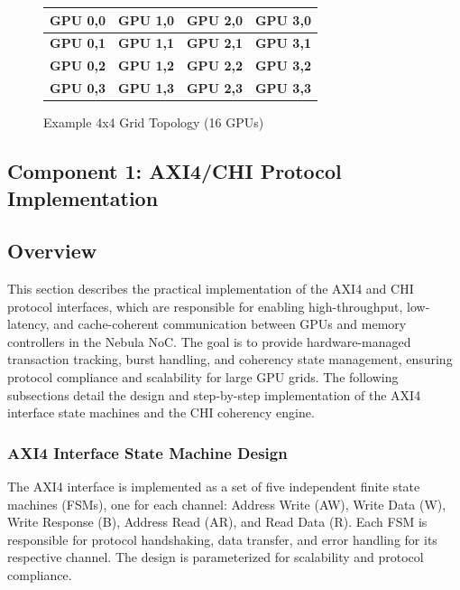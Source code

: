\documentclass[11pt,a4paper]{article}
\begin{document}
\begin{figure}[H]
    \centering
    \begin{tabular}{|c|c|c|c|}
        \hline
        \textbf{GPU 0,0} & \textbf{GPU 1,0} & \textbf{GPU 2,0} & \textbf{GPU 3,0} \\
        \hline
        \textbf{GPU 0,1} & \textbf{GPU 1,1} & \textbf{GPU 2,1} & \textbf{GPU 3,1} \\
        \hline
        \textbf{GPU 0,2} & \textbf{GPU 1,2} & \textbf{GPU 2,2} & \textbf{GPU 3,2} \\
        \hline
        \textbf{GPU 0,3} & \textbf{GPU 1,3} & \textbf{GPU 2,3} & \textbf{GPU 3,3} \\
        \hline
    \end{tabular}
    \caption{Example 4x4 Grid Topology (16 GPUs)}
\end{figure}

\subsection{Component 1: AXI4/CHI Protocol Implementation}

\subsection*{Overview}
This section describes the practical implementation of the AXI4 and CHI protocol interfaces, which are responsible for enabling high-throughput, low-latency, and cache-coherent communication between GPUs and memory controllers in the Nebula NoC. The goal is to provide hardware-managed transaction tracking, burst handling, and coherency state management, ensuring protocol compliance and scalability for large GPU grids. The following subsections detail the design and step-by-step implementation of the AXI4 interface state machines and the CHI coherency engine.

\subsubsection{AXI4 Interface State Machine Design}

The AXI4 interface is implemented as a set of five independent finite state machines (FSMs), one for each channel: Address Write (AW), Write Data (W), Write Response (B), Address Read (AR), and Read Data (R). Each FSM is responsible for protocol handshaking, data transfer, and error handling for its respective channel. The design is parameterized for scalability and protocol compliance.
\end{document}
